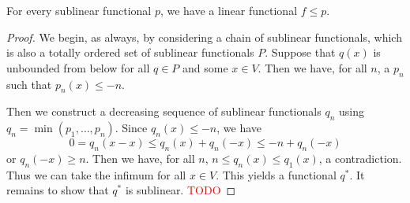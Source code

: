 \documentclass[prb,12pt]{revtex4-2}
\theoremstyle{definition}
\theoremstyle{definition}
\theoremstyle{definition}
\begin{document}
\begin{Theorem}
	For every sublinear functional $p$, we have a linear functional $f\le p$. 
\end{Theorem}
\begin{proof}
	We begin, as always, by considering a chain of sublinear functionals, which is also a totally ordered set of sublinear functionals $P$. Suppose that $q(x)$ is unbounded from below for all $q\in P$ and some $x\in V$. Then we have, for all $n$, a $p_n$ such that $p_n(x)\le -n$.

	Then we construct a decreasing sequence of sublinear functionals $q_n$ using $q_n=\min (p_1, \dots, p_n)$. Since $q_n(x)\le -n$, we have
	\[
	0=q_n(x-x)\le q_n(x)+q_n(-x)\le -n +q_n(-x)
	\]
	or $q_n(-x)\ge n$. Then we have, for all $n$, $n\le q_n(x)\le q_1(x)$, a contradiction. Thus we can take the infimum for all $x\in V$. This yields a functional $q^*$. It remains to show that $q^*$ is sublinear. \textcolor{red}{TODO} 
\end{proof}
\end{document}

